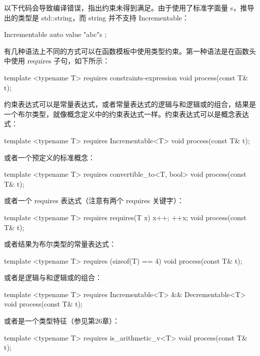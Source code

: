 以下代码会导致编译错误，指出约束未得到满足。由于使用了标准字面量 s，推导出的类型是 std::string，而 string 并不支持 Incrementable：

\begin{cpp}
Incrementable auto value { "abc"s };
\end{cpp}


有几种语法上不同的方式可以在函数模板中使用类型约束。第一种语法是在函数头中使用 requires 子句，如下所示：

\begin{cpp}
template <typename T> requires constraints-expression
void process(const T& t);
\end{cpp}

约束表达式可以是常量表达式，或者常量表达式的逻辑与和逻辑或的组合，结果是一个布尔类型，就像概念定义中的约束表达式一样。约束表达式可以是概念表达式：

\begin{cpp}
template <typename T> requires Incrementable<T>
void process(const T& t);
\end{cpp}

或者一个预定义的标准概念：

\begin{cpp}
template <typename T> requires convertible_to<T, bool>
void process(const T& t);
\end{cpp}

或者一个 requires 表达式（注意有两个 requires 关键字）：

\begin{cpp}
template <typename T> requires requires(T x) { x++; ++x; }
void process(const T& t);
\end{cpp}

或者结果为布尔类型的常量表达式：

\begin{cpp}
template <typename T> requires (sizeof(T) == 4)
void process(const T& t);
\end{cpp}

或者是逻辑与和逻辑或的组合：

\begin{cpp}
template <typename T> requires Incrementable<T> && Decrementable<T>
void process(const T& t);
\end{cpp}

或者是一个类型特征（参见第26章）：

\begin{cpp}
template <typename T> requires is_arithmetic_v<T>
void process(const T& t);
\end{cpp}

